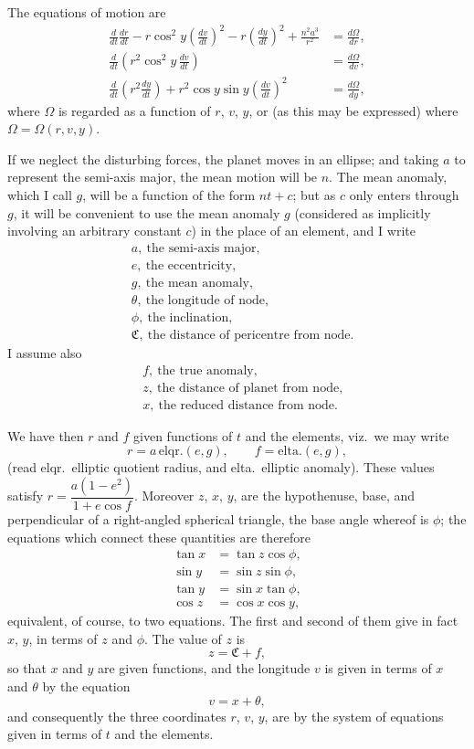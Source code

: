 \documentclass[11pt]{article}
\providecommand{\elqr}{\mathrm{elqr.}}
\providecommand{\elta}{\mathrm{elta.}}
\begin{document}
The equations of motion are
\begin{align*}
\frac{d}{dt}\frac{dr}{dt} - r\cos^2 y\left(\frac{dv}{dt}\right)^2 - r\left(\frac{dy}{dt}\right)^2 + \frac{n^2 a^3}{r^2} &= \frac{d\Omega}{dr},\\
\frac{d}{dt}\left(r^2 \cos^2 y\,\frac{dv}{dt}\right) &= \frac{d\Omega}{dv},\\
\frac{d}{dt}\left(r^2 \frac{dy}{dt}\right) + r^2 \cos y \sin y \left(\frac{dv}{dt}\right)^2 &= \frac{d\Omega}{dy},
\end{align*}
where $\Omega$ is regarded as a function of $r$, $v$, $y$, or (as this may be expressed) where $\Omega = \Omega(r,v,y)$.

\medskip

If we neglect the disturbing forces, the planet moves in an ellipse; and taking $a$ to represent the semi-axis major, the mean motion will be $n$. The mean anomaly, which I call $g$, will be a function of the form $nt + c$; but as $c$ only enters through $g$, it will be convenient to use the mean anomaly $g$ (considered as implicitly involving an arbitrary constant $c$) in the place of an element, and I write
\begin{align*}
& a,\ \text{the semi-axis major,}\\
& e,\ \text{the eccentricity,}\\
& g,\ \text{the mean anomaly,}\\
& \theta,\ \text{the longitude of node,}\\
& \phi,\ \text{the inclination,}\\
& \mathfrak{C},\ \text{the distance of pericentre from node.}
\end{align*}
I assume also
\begin{align*}
& f,\ \text{the true anomaly,}\\
& z,\ \text{the distance of planet from node,}\\
& x,\ \text{the reduced distance from node.}
\end{align*}

We have then $r$ and $f$ given functions of $t$ and the elements, viz.\ we may write
\[
r = a\,\elqr(e,g), \qquad f = \elta(e,g),
\]
(read elqr.\ elliptic quotient radius, and elta.\ elliptic anomaly). These values satisfy $r = \dfrac{a(1-e^2)}{1+e\cos f}$. Moreover $z$, $x$, $y$, are the hypothenuse, base, and perpendicular of a right-angled spherical triangle, the base angle whereof is $\phi$; the equations which connect these quantities are therefore
\begin{align*}
\tan x &= \tan z \cos\phi,\\
\sin y &= \sin z \sin\phi,\\
\tan y &= \sin x \tan\phi,\\
\cos z &= \cos x \cos y,
\end{align*}
equivalent, of course, to two equations. The first and second of them give in fact $x$, $y$, in terms of $z$ and $\phi$. The value of $z$ is
\[
z = \mathfrak{C} + f,
\]
so that $x$ and $y$ are given functions, and the longitude $v$ is given in terms of $x$ and $\theta$ by the equation
\[
v = x + \theta,
\]
and consequently the three coordinates $r$, $v$, $y$, are by the system of equations given in terms of $t$ and the elements.
\end{document}
